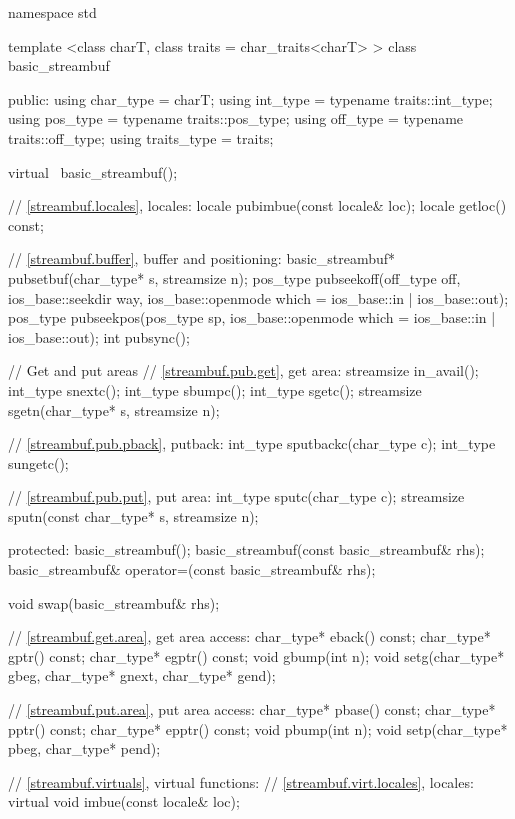 %
\begin{codeblock}
namespace std {
  template <class charT, class traits = char_traits<charT> >
  class basic_streambuf {
  public:
    using char_type   = charT;
    using int_type    = typename traits::int_type;
    using pos_type    = typename traits::pos_type;
    using off_type    = typename traits::off_type;
    using traits_type = traits;

    virtual ~basic_streambuf();

    // \ref{streambuf.locales}, locales:
    locale   pubimbue(const locale& loc);
    locale   getloc() const;

    // \ref{streambuf.buffer}, buffer and positioning:
    basic_streambuf* pubsetbuf(char_type* s, streamsize n);
    pos_type pubseekoff(off_type off, ios_base::seekdir way,
                        ios_base::openmode which
                          = ios_base::in | ios_base::out);
    pos_type pubseekpos(pos_type sp,
                        ios_base::openmode which
                          = ios_base::in | ios_base::out);
    int      pubsync();

    // Get and put areas
    // \ref{streambuf.pub.get}, get area:
    streamsize in_avail();
    int_type snextc();
    int_type sbumpc();
    int_type sgetc();
    streamsize sgetn(char_type* s, streamsize n);

    // \ref{streambuf.pub.pback}, putback:
    int_type sputbackc(char_type c);
    int_type sungetc();

    // \ref{streambuf.pub.put}, put area:
    int_type   sputc(char_type c);
    streamsize sputn(const char_type* s, streamsize n);

  protected:
    basic_streambuf();
    basic_streambuf(const basic_streambuf& rhs);
    basic_streambuf& operator=(const basic_streambuf& rhs);

    void swap(basic_streambuf& rhs);

    // \ref{streambuf.get.area}, get area access:
    char_type* eback() const;
    char_type* gptr()  const;
    char_type* egptr() const;
    void       gbump(int n);
    void       setg(char_type* gbeg, char_type* gnext, char_type* gend);

    // \ref{streambuf.put.area}, put area access:
    char_type* pbase() const;
    char_type* pptr() const;
    char_type* epptr() const;
    void       pbump(int n);
    void       setp(char_type* pbeg, char_type* pend);

    // \ref{streambuf.virtuals}, virtual functions:
    // \ref{streambuf.virt.locales}, locales:
    virtual void imbue(const locale& loc);

}}
\end{codeblock}
